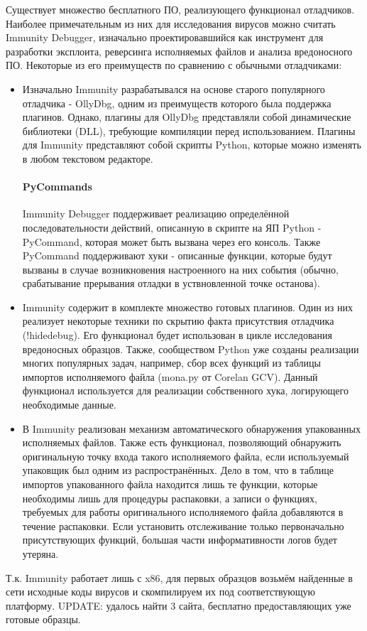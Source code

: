 Существует множество бесплатного ПО, реализующего функционал отладчиков. Наиболее примечательным из них для исследования вирусов можно считать Immunity Debugger, изначально проектировавшийся как инструмент для разработки эксплоита, реверсинга исполняемых файлов и анализа вредоносного ПО. Некоторые из его преимуществ по сравнению с обычными отладчиками:
\begin {itemize}
	\item Изначально Immunity разрабатывался на основе старого популярного отладчика - OllyDbg, одним из преимуществ которого была поддержка плагинов. Однако, плагины для OllyDbg представляли собой динамические библиотеки (DLL), требующие компиляции перед использованием. Плагины для Immunity представляют собой скрипты Python, которые можно изменять в любом текстовом редакторе.
	\paragraph {PyCommands}
Immunity Debugger поддерживает реализацию определённой последовательности действий, описанную в скрипте на ЯП Python - PyCommand, которая может быть вызвана через его консоль. Также PyCommand поддерживают хуки - описанные функции, которые будут вызваны в случае возникновения настроенного на них события (обычно, срабатывание прерывания отладки в уствновленной точке останова).
	\item Immunity содержит в комплекте множество готовых плагинов. Один из них реализует некоторые техники по скрытию факта присутствия отладчика (!hidedebug). Его функционал будет использован в цикле исследования вредоносных образцов. Также, сообществом Python уже созданы реализации многих популярных задач, например, сбор всех функций из таблицы импортов исполняемого файла (mona.py от Corelan GCV). Данный функционал используется для реализации собственного хука, логирующего необходимые данные.
	\item В Immunity реализован механизм автоматического обнаружения упакованных исполняемых файлов. Также есть функционал, позволяющий обнаружить оригинальную точку входа такого исполняемого файла, если используемый упаковщик был одним из распространённых. Дело в том, что в таблице импортов упакованного файла находится лишь те функции, которые необходимы лишь для процедуры распаковки, а записи о функциях, требуемых для работы оригинального исполняемого файла добавляются в течение распаковки. Если установить отслеживание только первоначально присутствующих функций, большая части информативности логов будет утеряна.
\end {itemize}
Т.к. Immunity работает лишь с x86, для первых образцов возьмём найденные в сети
исходные коды вирусов и скомпилируем их под соответствующую платформу.
UPDATE: удалось найти 3 сайта, бесплатно предоставляющих уже готовые образцы.
